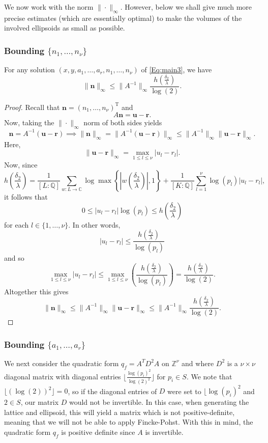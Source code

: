 We now work with the norm $\|\cdot \|_\infty$. However, below we shall give much more precise estimates (which are essentially optimal) to make the volumes of the involved ellipsoids as small as possible. 

\subsubsection{Bounding $\{n_1, \dots, n_{\nu}\}$}
\begin{lemma}
For any solution $(x,y, a_1, \dots, a_r, n_1, \dots, n_{\nu})$ of \eqref{Eq:main3}, we have 
\[\|\mathbf{n}\|_{\infty} \leq \|A^{-1}\|_{\infty} \frac{h\left(\frac{\delta_2}{\lambda}\right)}{\log(2)}.\]
\end{lemma}

\begin{proof}
Recall that $\mathbf{n} = (n_1, \dots, n_{\nu})^{\text{T}}$ and 
\[A\mathbf{n} = \mathbf{u} - \mathbf{r}.\]
Now, taking the $\| \cdot \|_{\infty}$ norm of both sides yields
\[ \mathbf{n} = A^{-1}( \mathbf{u} - \mathbf{r} ) \implies \|\mathbf{n}\|_{\infty} = \|A^{-1} (\mathbf{u} - \mathbf{r})\|_{\infty} \leq \|A^{-1}\|_{\infty} \|\mathbf{u} - \mathbf{r}\|_{\infty}.\]
Here, 
\[\|\mathbf{u}-\mathbf{r}\|_{\infty} = \max_{1 \leq l \leq \nu} |u_l - r_l|.\]
Now, since
\[h\left(\frac{\delta_2}{\lambda}\right) = \frac{1}{[L:\mathbb{Q}]}\sum_{w :L \to \mathbb{C}} \log \max \left\{ \left|w\left(\frac{\delta_2}{\lambda}\right)\right|, 1\right\} + \frac{1}{[K:\mathbb{Q}]}\sum_{l = 1}^{\nu} \log(p_l)|u_l - r_l|,\]
it follows that 
\[0 \leq |u_l - r_l| \log(p_l) \leq h\left(\frac{\delta_2}{\lambda}\right)\]
for each $l \in \{1, \dots, \nu\}$. In other words, 
\[|u_l - r_l| \leq \frac{h\left(\frac{\delta_2}{\lambda}\right)}{\log(p_l)}\]
and so
\[\max_{1 \leq l \leq \nu} |u_l - r_l| \leq \max_{1\leq l\leq \nu}\left(\frac{h\left(\frac{\delta_2}{\lambda}\right)}{\log(p_l)}\right) = \frac{h\left(\frac{\delta_2}{\lambda}\right)}{\log(2)}.\]
Altogether this gives
\[\|\mathbf{n}\|_{\infty} \leq \|A^{-1}\|_{\infty} \|\mathbf{u} - \mathbf{r}\|_{\infty} \leq \|A^{-1}\|_{\infty} \frac{h\left(\frac{\delta_2}{\lambda}\right)}{\log(2)}.\]
\end{proof}

\subsubsection{Bounding $\{a_1, \dots, a_{r}\}$}

We next consider the quadratic form $q_f=A^TD^2A$ on $\mathbb{Z}^{\nu}$ and where $D^2$ is a $\nu \times \nu$ diagonal matrix with diagonal entries $\lfloor\frac{\log(p_i)^2}{\log(2)^2}\rfloor$ for $p_i \in S$. We note that $\lfloor(\log(2))^2\rfloor = 0$, so if the diagonal entries of $D$ were set to $\lfloor\log(p_i)^2$ and $2\in S$, our matrix $D$ would not be invertible. In this case, when generating the lattice and ellipsoid, this will yield a matrix which is not positive-definite, meaning that we will not be able to apply Fincke-Pohst. With this in mind, the quadratic form $q_f$ is positive definite since $A$ is invertible. 

